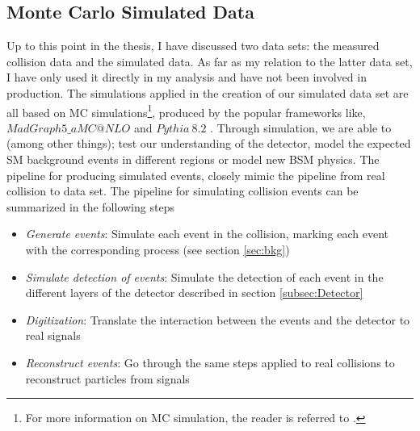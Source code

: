 \subsection{Monte Carlo Simulated Data}
Up to this point in the thesis, I have discussed two data sets: the measured collision data and the simulated data. 
As far as my relation to the latter data set, I have only used it directly in my analysis and have not been involved in 
production. The simulations applied in the creation of our simulated data set are all based on \acf{MC} simulations\footnote{For 
more information on \ac{MC} simulation, the reader is referred to \cite{raychaudhuri_introduction_2008}.}, produced 
by the popular frameworks like, \emph{$MadGraph5\_aMC@NLO$} and \emph{$Pythia\ 8.2$} \cite{alwall_automated_2014, sjostrand_introduction_2015}. 
Through simulation, we are able to (among other things); test our understanding of the detector, model the expected \ac{SM} background 
events in different regions or model new \ac{BSM} physics. The pipeline for producing simulated events, closely mimic the pipeline 
from real collision to data set. The pipeline for simulating collision events can be summarized in the following steps
\begin{itemize}
  \item \emph{Generate events}: Simulate each event in the collision, marking each event with the corresponding process (see section \ref{sec:bkg})
  \item \emph{Simulate detection of events}: Simulate the detection of each event in the different layers of the detector described in section \ref{subsec:Detector}
  \item \emph{Digitization}: Translate the interaction between the events and the detector to real signals
  \item \emph{Reconstruct events}: Go through the same steps applied to real collisions to reconstruct particles from signals
\end{itemize}
